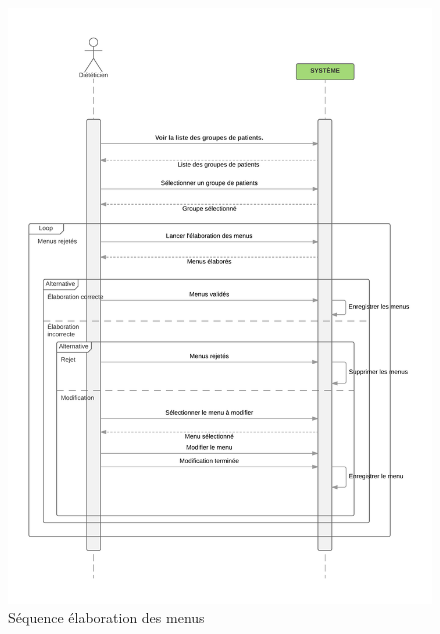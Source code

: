 \begin{figure}
  \centering
      \includegraphics[width=1.00\textwidth]{../../CasDUtilisations/MenuGen/Sequence/ElaborationMenus.png} %
\caption{Séquence élaboration des menus}
\label{MenuGenSeq}
\end{figure}

